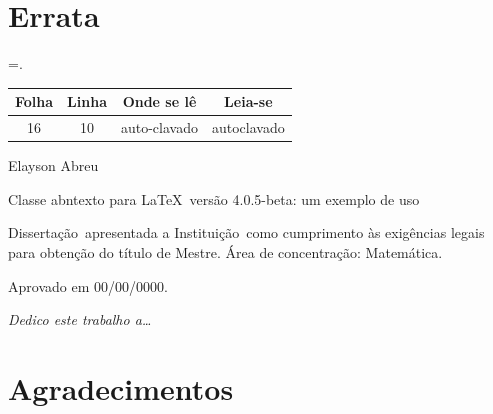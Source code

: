 \documentclass{abntexto}
\def \Autor{Elayson Abreu}
\def \Instituicao{Instituição}
\def \Titulo{Classe {\ttfamily abntexto} para \LaTeX\ versão 4.0.5-beta: um exemplo de uso}
\def \TipoDeTrabalho{Dissertação}
\def \DescricaoDoTrabalho{\TipoDeTrabalho\ apresentada a \Instituicao\ como cumprimento às exigências legais para obtenção do título de Mestre.}
\def \AreaDeConcentracao{Matemática}
\def\Centro{\noindent\hfil}
\def\Direita{\noindent\hfill}
\def\bibfont{\raggedright\interlinepenalty=10000\singlesp\bibitemsep=\baselineskip}
\begin{document}

\nonum\notoc\section{Errata}

\begingroup \bibfont{}. \par\endgroup %
\Enter

\Centro
\begin{tabular}{cccc}
    \hline
    \bfseries Folha & \bfseries Linha & \bfseries Onde se lê & \bfseries Leia-se \\ \hline
    16 & 10 & auto-clavado & autoclavado \\ \hline
\end{tabular}
\newpage


\Centro\Autor
\Enter[9]

\Centro
\begin{minipage}{.7\linewidth}
    \centering
    \Titulo
\end{minipage}
\Enter[2]

\Direita
\begin{minipage}{.5\linewidth}
    \singlesp\nohyph
    \DescricaoDoTrabalho\Enter
    Área de concentração: \AreaDeConcentracao.
\end{minipage}
\Enter

{\parindent=1.5cm Aprovado em 00/00/0000.\par}
\Enter

\Enter
{}\Enter
{}
\newpage


\leavevmode\vfill

\Direita
\begin{minipage}{5cm}
    \itshape Dedico este trabalho a\dots
\end{minipage}
\newpage


\nonum\notoc\section{Agradecimentos}
{\parindent=1.5cm\lipsum[1]\par}
\newpage
\end{document}
